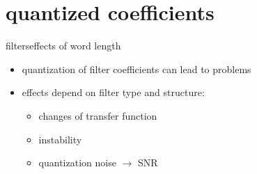     \section{quantized coefficients}
		\begin{frame}{filters}{effects of word length}
            \vspace{-5mm}
            \begin{itemize}
                \item   quantization of filter coefficients can lead to problems
                \item   effects depend on filter type and structure:
                    \begin{itemize}
                        \item   changes of transfer function
                        \item   instability
                        \item   quantization noise $\rightarrow$ SNR
                    \end{itemize}
            \end{itemize}
			\vspace{-3mm}
\end{frame}
